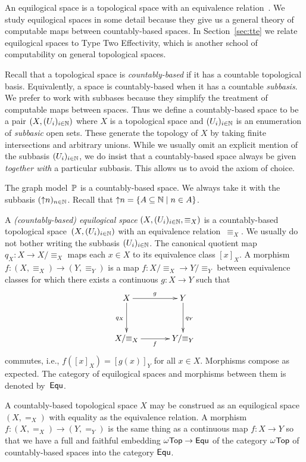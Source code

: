 An equilogical space is a topological space with an
equivalence relation~\cite{BauerA:equs}. We study equilogical spaces
in some detail because they give us a general theory of computable
maps between countably-based spaces. In Section~\ref{sec:tte} we
relate equilogical spaces to Type Two Effectivity, which is another
school of computability on general topological spaces.

Recall that a topological space is \emph{countably-based} if it has a
countable topological basis. Equivalently, a space is countably-based
when it has a countable \emph{subbasis}. We prefer to work with
subbases because they simplify the treatment of computable maps
between spaces. Thus we define a countably-based space to be a pair
$(X, (U_i)_{i \in \mathbb{N}})$ where $X$ is a topological space and
$(U_i)_{i \in \mathbb{N}}$ is an enumeration of \emph{subbasic} open sets.
These generate the topology of $X$ by taking finite intersections and
arbitrary unions. While we usually omit an explicit mention of the
subbasis $(U_i)_{i \in \mathbb{N}}$, we do insist that a countably-based
space always be given \emph{together with} a particular subbasis. This
allows us to avoid the axiom of choice.

The graph model~$\mathbb{P}$ is a countably-based space. We always take it
with the subbasis $({\uparrow}n)_{n \in \mathbb{N}}$. Recall that ${\uparrow}n =
\{A \subseteq \mathbb{N} \mid n \in A\}$.

A \emph{(countably-based) equilogical space} $(X, (U_i)_{i \in \mathbb{N}},
{\equiv_X})$ is a countably-based topological space~$(X, (U_i)_{i \in
  \mathbb{N}})$ with an equivalence relation~$\equiv_X$. We usually do not
bother writing the subbasis $(U_i)_{i \in \mathbb{N}}$. The canonical
quotient map $q_X : X \to X/{\equiv_X}$ maps each $x \in X$ to its
equivalence class $[x]_X$. A morphism $f : (X,{\equiv_X}) \to
(Y,{\equiv_Y})$ is a map $f : X/{\equiv_X} \to Y/{\equiv_Y}$ between
equivalence classes for which there exists a continuous $g : X \to Y$
such that
%
\begin{equation*}
  \xymatrix@+1em{
    {X} \ar[d]_{q_X} \ar[r]^g
    &
    {Y} \ar[d]^{q_Y}
    \\
    {X/{\equiv_X}}
    \ar[r]_f
    &
    {Y/{\equiv_Y}}
  }
\end{equation*}
%
commutes, i.e., $f([x]_X) = [g(x)]_Y$ for all $x \in X$. Morphisms
compose as expected. The category of equilogical spaces and morphisms
between them is denoted by~$\mathsf{Equ}$.

A countably-based topological space $X$ may be construed as an
equilogical space $(X, {=_X})$ with equality as the equivalence
relation. A morphism $f : (X, {=_X}) \to (Y, {=_Y})$ is the same
thing as a continuous map $f : X \to Y$ so that we have a full and
faithful embedding $\mathsf{\omega Top} \to \mathsf{Equ}$ of the category $\mathsf{\omega Top}$ of
countably-based spaces into the category $\mathsf{Equ}$.

